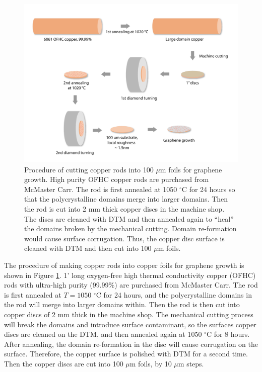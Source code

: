 \documentclass[pdflatex, sectionletters, 12pt, final, phd]{pittetd}    %
\begin{document}
\begin{figure}[p]
	\centering
	\includegraphics[width=1\textwidth]{Drawing/CopperProcessing.pdf}
	\caption[Procedure of copper substrate preparation]{Procedure of cutting copper rods into 100 $\mu$m foils for graphene growth. High purity OFHC copper rods are purchased from McMaster Carr. The rod is first annealed at 1050 $^{\circ}$C for 24 hours so that the polycrystalline domains merge into larger domains. Then the rod is cut into 2 mm thick copper discs in the machine shop. The discs are cleaned with DTM and then annealed again to ``heal'' the domains broken by the mechanical cutting. Domain re-formation would cause surface corrugation. Thus, the copper disc surface is cleaned with DTM and then cut into 100 $\mu$m foils.}
	\label{FIG:CopperProcessing}
\end{figure}

The procedure of making copper rods into copper foils for graphene growth is shown in Figure \ref{FIG:CopperProcessing}. 1' long oxygen-free high thermal conductivity copper (OFHC) rods with ultra-high purity (99.99\%) are purchased from McMaster Carr. The rod is first annealed at $T=1050$ $^{\circ}$C for 24 hours, and the polycrystalline domains in the rod will merge into larger domains within. Then the rod is then cut into copper discs of 2 mm thick in the machine shop. The mechanical cutting process will break the domains and introduce surface contaminant, so the surfaces copper discs are cleaned on the DTM, and then annealed again at 1050 $^{\circ}$C for 8 hours. After annealing, the domain re-formation in the disc will cause corrugation on the surface. Therefore, the copper surface is polished with DTM for a second time. Then the copper discs are cut into 100 $\mu$m foils, by 10 $\mu$m steps.
\end{document}
